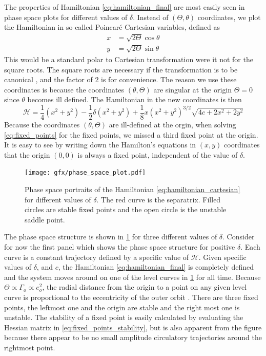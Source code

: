 \documentclass[ twoside,openright,titlepage,numbers=noenddot,headinclude,%
                footinclude=true,cleardoublepage=empty,abstractoff, %
                BCOR=5mm,paper=a4,fontsize=11pt,%
                american,%
                ]{scrreprt}
\begin{document}
The properties of Hamiltonian \ref{eq:hamiltonian_final} are most easily seen
in phase space plots for different values of $\delta$. Instead of $(\Theta,\theta)$ 
coordinates, we plot the Hamiltonian
in so called Poincaré Cartesian variables, defined as 
\begin{equation}
    \begin{aligned}
        x&=\sqrt{2\Theta}\cos\theta\\
        y&=\sqrt{2\Theta}\sin\theta
    \end{aligned}
\end{equation}
This would be a standard polar to Cartesian transformation were it not for the 
square roots. The square roots are necessary if the transformation is to be 
canonical \citep{sylvio}, and the factor of 2 is for convenience. The reason
we use these coordinates is because the coordinates $(\theta,\Theta)$ are
singular at the origin $\Theta=0$ since $\theta$ becomes ill defined. 
The Hamiltonian in the new coordinates is then
\begin{equation}
    \mathcal{H}= \frac{1}{4}\left( x^2+y^2\right) - \frac{1}{2}\delta\left(
    x^2+y^2\right)+ \frac{1}{8} x\left(x^2+y^2\right)^{3/2}\sqrt{4c+2x^2+2y^2}
    \label{eq:hamiltonian_cartesian}
\end{equation}
Because the coordinates $(\theta,\Theta)$ are ill-defined at the orgin, when
solving \cref{eq:fixed_points} for the fixed points, we missed a third fixed 
point at the origin. It is easy to see by writing down the Hamilton's
equations in $(x,y)$ coordinates that the origin $(0,0)$ is always a fixed
point, independent of the value of $\delta$.
\begin{figure}
\centering
\texttt{[image: gfx/phase\_space\_plot.pdf]}
    \caption{Phase space portraits of the Hamiltonian 
    \ref{eq:hamiltonian_cartesian} for different values of 
    $\delta$. The red curve
    is the separatrix. Filled circles are stable fixed points and the open
    circle is the unstable saddle point.}
\label{fig:phase_space}
\end{figure}

The phase space structure is shown in \cref{fig:phase_space} for three different
values of $\delta$. Consider for now the first panel which shows the phase space
structure for positive $\delta$. Each curve is a constant trajectory defined by a specific value
of $\mathcal{H}$. Given specific values of $\delta$, and $c$, the Hamiltonian 
\ref{eq:hamiltonian_final} is completely defined and the system moves around on
one of the level curves in \cref{fig:phase_space} for all time. 
Because $\Theta\propto \Gamma_o\propto e_o^2$, the radial distance
from the origin to a point on any given level curve is proportional to the eccentricity
of the outer orbit . There are three fixed points, the
leftmost one and the origin are stable and the right most one is unstable. The 
stability of a fixed point is easily calculated by evaluating the Hessian matrix in
\cref{eq:fixed_points_stability}, but is also apparent from the figure because there
appear to be no small amplitude circulatory trajectories around the rightmost point. 
\end{document}
